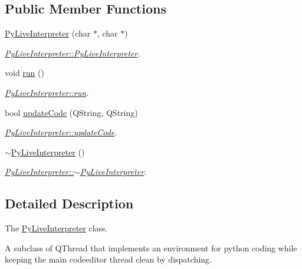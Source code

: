 \subsection*{Public Member Functions}
\begin{DoxyCompactItemize}
\item 
\hyperlink{classPyLiveInterpreter_a1781393242e987a75f549d59531db321}{Py\+Live\+Interpreter} (char $\ast$, char $\ast$)
\begin{DoxyCompactList}\small\item\em \hyperlink{classPyLiveInterpreter_a1781393242e987a75f549d59531db321}{Py\+Live\+Interpreter\+::\+Py\+Live\+Interpreter}. \end{DoxyCompactList}\item 
void \hyperlink{classPyLiveInterpreter_a8570e8a6c3726d450fd2fb5f74a86461}{run} ()
\begin{DoxyCompactList}\small\item\em \hyperlink{classPyLiveInterpreter_a8570e8a6c3726d450fd2fb5f74a86461}{Py\+Live\+Interpreter\+::run}. \end{DoxyCompactList}\item 
bool \hyperlink{classPyLiveInterpreter_ab02b4ef045b07140fae048295ef336b8}{update\+Code} (Q\+String, Q\+String)
\begin{DoxyCompactList}\small\item\em \hyperlink{classPyLiveInterpreter_ab02b4ef045b07140fae048295ef336b8}{Py\+Live\+Interpreter\+::update\+Code}. \end{DoxyCompactList}\item 
\hyperlink{classPyLiveInterpreter_a400b3e1ed26b84937c7e8738191942e0}{$\sim$\+Py\+Live\+Interpreter} ()
\begin{DoxyCompactList}\small\item\em \hyperlink{classPyLiveInterpreter_a400b3e1ed26b84937c7e8738191942e0}{Py\+Live\+Interpreter\+::$\sim$\+Py\+Live\+Interpreter}. \end{DoxyCompactList}\end{DoxyCompactItemize}


\subsection{Detailed Description}
The \hyperlink{classPyLiveInterpreter}{Py\+Live\+Interpreter} class. 

A subclass of Q\+Thread that implements an environment for python coding while keeping the main codeeditor thread clean by dispatching. 

